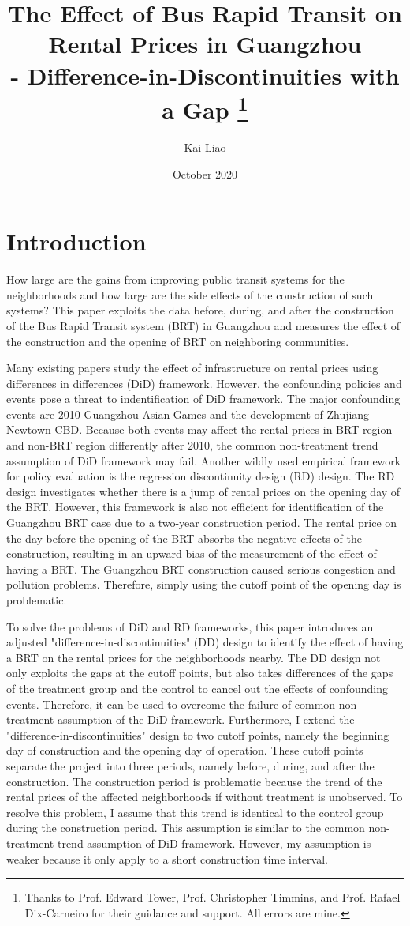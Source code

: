 \documentclass[12pt]{article}
\title{\myfont The Effect of Bus Rapid Transit on Rental Prices in Guangzhou \\- Difference-in-Discontinuities with a Gap \footnote{Thanks to Prof. Edward Tower, Prof. Christopher Timmins, and Prof. Rafael Dix-Carneiro for their guidance and support. All errors are mine.}}
\author{Kai Liao  }
\date{October 2020}
\begin{document}
\maketitle

\section{Introduction}
How large are the gains from improving public transit systems for the neighborhoods and how large are the side effects of the construction of such systems? This paper exploits the data before, during, and after the construction of the Bus Rapid Transit system (BRT) in Guangzhou and measures the effect of the construction and the opening of BRT on neighboring communities. 

Many existing papers study the effect of infrastructure on rental prices using differences in differences (DiD) framework. However, the confounding policies and events pose a threat to indentification of DiD framework. The major confounding events are 2010 Guangzhou Asian Games and the development of Zhujiang Newtown CBD. Because both events may affect the rental prices in BRT region and non-BRT region differently after 2010, the common non-treatment trend assumption of DiD framework may fail. Another wildly used empirical framework for policy evaluation is the regression discontinuity design (RD) design. The RD design investigates whether there is a jump of rental prices on the opening day of the BRT. However, this framework is also not efficient for identification of the Guangzhou BRT case due to a two-year construction period. The rental price on the day before the opening of the BRT absorbs the negative effects of the construction, resulting in an upward bias of the measurement of the effect of having a BRT. The Guangzhou BRT construction caused serious congestion and pollution problems. Therefore, simply using the cutoff point of the opening day is problematic. 

To solve the problems of DiD and RD frameworks, this paper introduces an adjusted "difference-in-discontinuities" (DD) design to identify the effect of having a BRT on the rental prices for the neighborhoods nearby. The DD design not only exploits the gaps at the cutoff points, but also takes differences of the gaps of the treatment group and the control to cancel out the effects of confounding events. Therefore, it can be used to overcome the failure of common non-treatment assumption of the DiD framework. Furthermore, I extend the "difference-in-discontinuities" design to two cutoff points, namely the beginning day of construction and the opening day of operation. These cutoff points separate the project into three periods, namely before, during, and after the construction. The construction period is problematic because the trend of the rental prices of the affected neighborhoods if without treatment is unobserved. To resolve this problem, I assume that this trend is identical to the control group during the construction period. This assumption is similar to the common non-treatment trend assumption of DiD framework. However, my assumption is weaker because it only apply to a short construction time interval.
\end{document}
